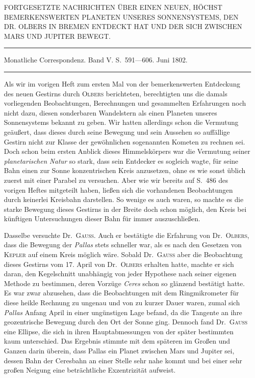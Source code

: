 %
\bigskip{}
\begin{center}
{\small FORTGESETZTE NACHRICHTEN ÜBER EINEN NEUEN, HÖCHST BEMERKENSWERTEN PLANETEN UNSERES SONNENSYSTEMS, DEN DR. OLBERS IN BREMEN ENTDECKT HAT UND DER SICH ZWISCHEN MARS UND JUPITER BEWEGT.\par}
\medskip\hrule\medskip
Monatliche Correspondenz. Band V. S.\ 591—606. Juni 1802.\par
\medskip\hrule
\end{center}\medskip
Als wir im vorigen Heft zum ersten Mal von der bemerkenswerten Entdeckung des neuen Gestirns durch \textsc{Olbers} berichteten, berechtigten uns die damals vorliegenden Beobachtungen, Berechnungen und gesammelten Erfahrungen noch nicht dazu, diesen sonderbaren Wandelstern als einen Planeten unseres Sonnensystems bekannt zu geben. Wir hatten allerdings schon die Vermutung geäußert, dass dieses durch seine Bewegung und sein Aussehen so auffällige Gestirn nicht zur Klasse der gewöhnlichen sogenannten Kometen zu rechnen sei. Doch schon beim ersten Anblick dieses Himmelskörpers war die Vermutung seiner \textit{planetarischen Natur} so stark, dass sein Entdecker es sogleich wagte, für seine Bahn einen zur Sonne konzentrischen Kreis anzusetzen, ohne es wie sonst üblich zuerst mit einer Parabel zu versuchen. Aber wie wir bereits auf S.\ 486 des vorigen Heftes mitgeteilt haben, ließen sich die vorhandenen Beobachtungen durch keinerlei Kreisbahn darstellen. So wenige es auch waren, so machte es die starke Bewegung dieses Gestirns in der Breite doch schon möglich, den Kreis bei künftigen Untersuchungen dieser Bahn für immer auszuschließen.

Dasselbe versuchte Dr.\ \textsc{Gauß}. Auch er bestätigte die Erfahrung von Dr.\ \textsc{Olbers}, dass die Bewegung der \textit{Pallas} stets schneller war, als es nach den Gesetzen von \textsc{Kepler} auf einem Kreis möglich wäre. Sobald Dr.\ \textsc{Gauß} aber die Beobachtung dieses Gestirns vom 17. April von Dr.\ \textsc{Olbers} erhalten hatte, machte er sich daran, den Kegelschnitt unabhängig von jeder Hypothese nach seiner eigenen Methode zu bestimmen, deren Vorzüge \textit{Ceres} schon so glänzend bestätigt hatte. Es war zwar abzusehen, dass die Beobachtungen mit dem Ringmikrometer für diese heikle Rechnung zu ungenau und von zu kurzer Dauer waren, zumal sich \textit{Pallas} Anfang April in einer ungünstigen Lage befand, da die Tangente an ihre geozentrische Bewegung durch den Ort der Sonne ging. Dennoch fand Dr.\ \textsc{Gauß} eine Ellipse, die sich in ihren Hauptabmessungen von der später bestimmten kaum unterschied. Das Ergebnis stimmte mit dem späteren im Großen und Ganzen darin überein, dass Pallas ein Planet zwischen Mars und Jupiter sei, dessen Bahn der Ceresbahn an einer Stelle sehr nahe kommt und bei einer sehr großen Neigung eine beträchtliche Exzentrizität aufweist.

